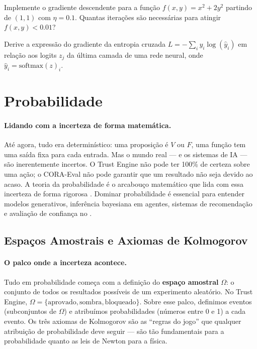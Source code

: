 \begin{exercicio}
    Implemente o gradiente descendente para a função
    $f(x, y) = x^2 + 2y^2$ partindo de $(1, 1)$ com $\eta = 0.1$.
    Quantas iterações são necessárias para atingir $f(x, y) < 0.01$?
\end{exercicio}

\begin{exercicio}
    Derive a expressão do gradiente da entropia cruzada
    $L = -\sum_i y_i \log(\hat{y}_i)$ em relação aos logits $z_j$ da última
    camada de uma rede neural, onde $\hat{y}_i = \text{softmax}(z)_i$.
\end{exercicio}

\section{Probabilidade}
\label{sec:probabilidade}
\nivelintermediario

\paragraph{Lidando com a incerteza de forma matemática.} Até agora, tudo era
determinístico: uma proposição é $V$ ou $F$, uma função tem uma saída fixa
para cada entrada. Mas o mundo real --- e os sistemas de IA --- são
inerentemente incertos. O Trust Engine não pode ter 100\% de certeza sobre
uma ação; o CORA-Eval não pode garantir que um resultado não seja devido ao
acaso. A teoria da probabilidade é o arcabouço matemático que lida com essa
incerteza de forma rigorosa \cite{wasserman2004all, hastie2009elements,
russell2020inteligencia}. Dominar probabilidade é essencial para entender
modelos generativos, inferência bayesiana em agentes, sistemas de
recomendação e avaliação de confiança no \opencodeeco{}.

\subsection{Espaços Amostrais e Axiomas de Kolmogorov}

\paragraph{O palco onde a incerteza acontece.} Tudo em probabilidade começa
com a definição do \textbf{espaço amostral} $\Omega$: o conjunto de todos os
resultados possíveis de um experimento aleatório. No Trust Engine, $\Omega =
\{\text{aprovado}, \text{sombra}, \text{bloqueado}\}$. Sobre esse palco,
definimos eventos (subconjuntos de $\Omega$) e atribuímos probabilidades
(números entre 0 e 1) a cada evento. Os três axiomas de Kolmogorov são as
``regras do jogo'' que qualquer atribuição de probabilidade deve seguir ---
são tão fundamentais para a probabilidade quanto as leis de Newton para a
física.


